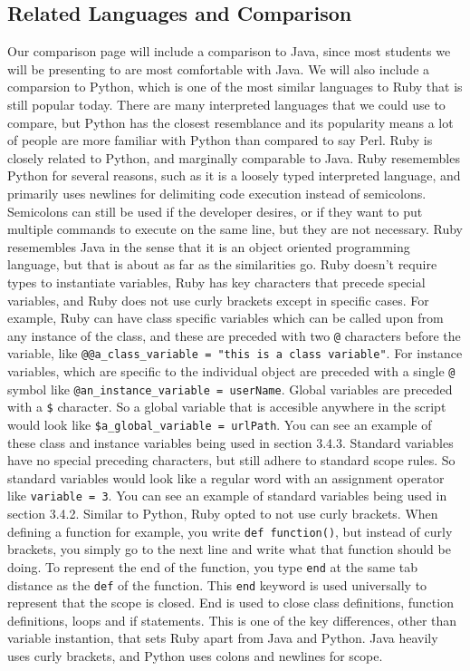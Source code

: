 \documentclass{article}
\begin{document}
\subsection{Related Languages and Comparison}
  Our comparison page will include a comparison to Java, since most students we will be presenting to are most comfortable with Java. We will also include a comparsion to Python,
  which is one of the most similar languages to Ruby that is still popular today. There are many interpreted languages that we could use to compare, but Python has the closest resemblance
  and its popularity means a lot of people are more familiar with Python than compared to say Perl.
  \newline
  \newline
  Ruby is closely related to Python, and marginally comparable to Java.
  Ruby resemembles Python for several reasons, such as it is a loosely typed interpreted language, and primarily uses newlines for delimiting
  code execution instead of semicolons. Semicolons can still be used if the developer desires, or if they want to put multiple commands to execute on the same line, 
  but they are not necessary. \newline
  Ruby resemembles Java in the sense that it is an object oriented programming language, but that is about as far as the similarities go. Ruby doesn't require types to instantiate variables, 
  Ruby has key characters that precede special variables, and Ruby does not use curly brackets except in specific cases. For example, Ruby can have class specific variables which can be called upon from any instance of the class, and these are
  preceded with two \verb|@| characters before the variable, like \verb|@@a_class_variable = "this is a class variable"|. For instance variables, which are specific to the individual object are preceded with a single \verb|@| symbol like \verb|@an_instance_variable = userName|.
  Global variables are preceded with a \verb|$| character. So a global variable that is accesible anywhere in the script would look like \verb|$a_global_variable = urlPath|. You can see an example of these class and instance variables being used in section 3.4.3.
  Standard variables have no special preceding characters, but still adhere to standard scope rules. So standard variables would look like a regular word with an assignment operator like \verb|variable = 3|. You can see an example of standard variables being used in section 3.4.2. \newline
  Similar to Python, Ruby opted to not use curly brackets. When defining a function for example, you write \verb|def function()|, but instead of curly brackets, you simply go to the next line and write what
  that function should be doing. To represent the end of the function, you type \verb|end| at the same tab distance as the \verb|def| of the function. This \verb|end| keyword is used universally to represent that the scope is closed.
  End is used to close class definitions, function definitions, loops and if statements. This is one of the key differences, other than variable instantion, that sets Ruby apart from Java and Python.
  Java heavily uses curly brackets, and Python uses colons and newlines for scope.
\end{document}
